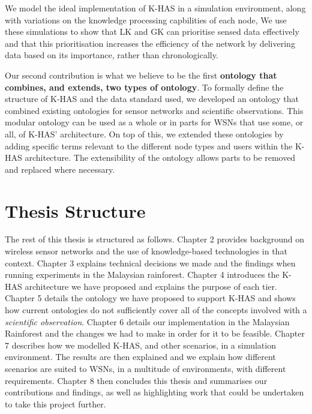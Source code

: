 We model the ideal implementation of K-HAS in a simulation environment, along with variations on the knowledge processing capbilities of each node, We use these simulations to show that LK and GK can prioritise sensed data effectively and that this prioritisation increases the efficiency of the network by delivering data based on its importance, rather than chronologically.

Our second contribution is what we believe to be the first \textbf{ontology that combines, and extends,  two types of ontology}. To formally define the structure of K-HAS and the data standard used, we developed an ontology that combined existing ontologies for sensor networks and scientific observations. This modular ontology can be used as a whole or in parts for WSNs that use some, or all, of K-HAS' architecture. On top of this, we extended these ontologies by adding specific terms relevant to the different node types and users within the K-HAS architecture. The extensibility of the ontology allows parts to be removed and replaced where necessary.


\section{Thesis Structure}
The rest of this thesis is structured as follows. Chapter 2 provides background on wireless sensor networks and the use of knowledge-based technologies in that context. Chapter 3 explains technical decisions we made and the findings when running experiments in the Malaysian rainforest. Chapter 4 introduces the K-HAS architecture we have proposed and explains the purpose of each tier. Chapter 5 details the ontology we have proposed to support K-HAS and shows how current ontologies do not sufficiently cover all of the concepts involved with a \textit{scientific observation}. Chapter 6 details our implementation in the Malaysian Rainforest and the changes we had to make in order for it to be feasible. Chapter 7 describes how we modelled K-HAS, and other scenarios, in a simulation environment. The results are then explained and we explain how different scenarios are suited to WSNs, in a multitude of environments, with different requirements. Chapter 8 then concludes this thesis and summarises our contributions and findings, as well as highlighting work that could be undertaken to take this project further.

